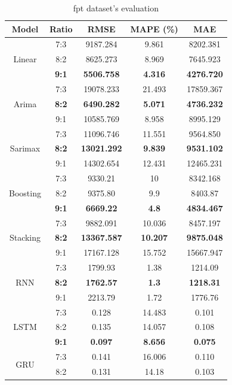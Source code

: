 \documentclass[conference]{IEEEtran}
\begin{document}
\begin{table}[H]
    \centering
    \caption{fpt dataset's evaluation}
    \begin{tabular}{|c|c|c|c|c|}
 \hline
 \rule{0pt}{2ex}
 \centering Model & Ratio & RMSE & MAPE (\%) & MAE\\
 \hline
 \multirow{3}{*}{Linear} & 7:3 & 9187.284 & 9.861 & 8202.381 \\ 
 & 8:2 & 8625.273 & 8.969 & 7645.923 \\ 
 & \textbf{9:1} & \textbf{5506.758} & \textbf{4.316} & \textbf{4276.720} \\
 \hline
 \multirow{3}{*}{Arima} & 7:3 & 19078.233 & 21.493 & 17859.367 \\ 
 & \textbf{8:2} & \textbf{6490.282} & \textbf{5.071} & \textbf{4736.232} \\ 
 & 9:1 & 10585.769 & 8.958 & 8995.129 \\
 \hline
 \multirow{3}{*}{Sarimax} & 7:3 & 11096.746 & 11.551 & 9564.850 \\ 
 & \textbf{8:2} & \textbf{13021.292} & \textbf{9.839} & \textbf{9531.102} \\ 
 & 9:1 & 14302.654 & 12.431 & 12465.231 \\
 \hline
 \multirow{3}{*}{Boosting} & 7:3 & 9330.21 & 10 & 8342.168 \\ 
 & 8:2 & 9375.80 & 9.9 & 8403.87 \\ 
 & \textbf{9:1} & \textbf{6669.22} & \textbf{4.8} & \textbf{4834.467} \\
 \hline
 \multirow{3}{*}{Stacking} & 7:3 & 9882.091 & 10.036 & 8457.197 \\ 
 & \textbf{8:2} & \textbf{13367.587} & \textbf{10.207} & \textbf{9875.048} \\ 
 & 9:1 & 17167.128 & 15.752 & 15667.947 \\
 \hline
 \multirow{3}{*}{RNN} & 7:3 & 1799.93 & 1.38 & 1214.09 \\ 
 & \textbf{8:2} & \textbf{1762.57} & \textbf{1.3} & \textbf{1218.31} \\ 
 & 9:1 & 2213.79 & 1.72 & 1776.76 \\
 \hline
 \multirow{3}{*}{LSTM} & 7:3 & 0.128 & 14.483 & 0.101 \\ 
 & 8:2 & 0.135 & 14.057 & 0.108 \\ 
 & \textbf{9:1} & \textbf{0.097} & \textbf{8.656} & \textbf{0.075} \\
 \hline
 \multirow{3}{*}{GRU} & 7:3 & 0.141 & 16.006 & 0.110 \\ 
 & 8:2 & 0.131 & 14.18 & 0.103 \\ 

\end{tabular}
\end{table}
\end{document}
